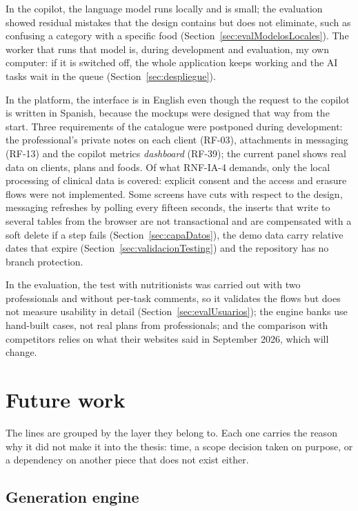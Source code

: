 In the copilot, the language model runs locally and is small; the evaluation showed residual mistakes that the design contains but does not eliminate, such as confusing a category with a specific food (Section~\ref{sec:evalModelosLocales}). The worker that runs that model is, during development and evaluation, my own computer: if it is switched off, the whole application keeps working and the AI tasks wait in the queue (Section~\ref{sec:despliegue}).

In the platform, the interface is in English even though the request to the copilot is written in Spanish, because the mockups were designed that way from the start. Three requirements of the catalogue were postponed during development: the professional's private notes on each client (RF-03), attachments in messaging (RF-13) and the copilot metrics \textit{dashboard} (RF-39); the current panel shows real data on clients, plans and foods. Of what RNF-IA-4 demands, only the local processing of clinical data is covered: explicit consent and the access and erasure flows were not implemented. Some screens have cuts with respect to the design, messaging refreshes by polling every fifteen seconds, the inserts that write to several tables from the browser are not transactional and are compensated with a soft delete if a step fails (Section~\ref{sec:capaDatos}), the demo data carry relative dates that expire (Section~\ref{sec:validacionTesting}) and the repository has no branch protection.

In the evaluation, the test with nutritionists was carried out with two professionals and without per-task comments, so it validates the flows but does not measure usability in detail (Section~\ref{sec:evalUsuarios}); the engine banks use hand-built cases, not real plans from professionals; and the comparison with competitors relies on what their websites said in September 2026, which will change.

\section*{Future work}
\label{sec:futureWork}

The lines are grouped by the layer they belong to. Each one carries the reason why it did not make it into the thesis: time, a scope decision taken on purpose, or a dependency on another piece that does not exist either.

\subsection*{Generation engine}
\label{sec:futureEngine}

